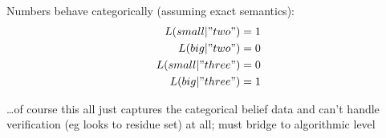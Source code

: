 \documentclass[10pt,letterpaper]{article}
\begin{document}
Numbers behave categorically (assuming exact semantics):
\begin{eqnarray*}
L(small|"two") = 1\\
L(big|"two") = 0\\
L(small|"three") = 0\\
L(big|"three") = 1
\end{eqnarray*}

\dots of course this all just captures the categorical belief data and can't handle verification (eg looks to residue set) at all; must bridge to algorithmic level





%




\setlength{\bibleftmargin}{.125in}
\setlength{\bibindent}{-\bibleftmargin}


\end{document}
